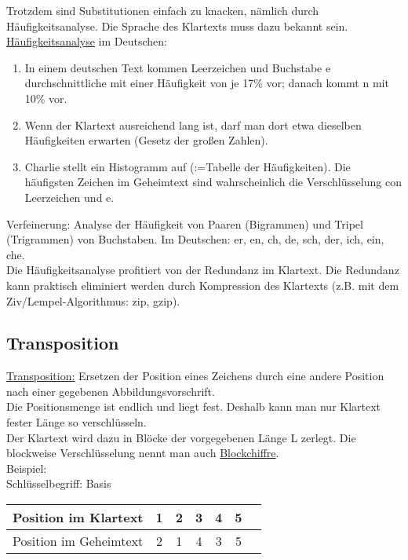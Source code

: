 \documentclass[a4paper,12pt]{article}
\begin{document}
Trotzdem sind Substitutionen einfach zu knacken, nämlich durch Häufigkeitsanalyse. Die Sprache des Klartexts muss dazu bekannt sein.\\
\underline{Häufigkeitsanalyse} im Deutschen:
\begin{enumerate}
 \item In einem deutschen Text kommen Leerzeichen und Buchstabe e durchschnittliche mit einer Häufigkeit von je 17\% vor; danach kommt n mit 10\% vor.
 \item Wenn der Klartext ausreichend lang ist, darf man dort etwa dieselben Häufigkeiten erwarten (\glqq Gesetz der großen Zahlen\grqq).
 \item Charlie stellt ein Histogramm auf (:=Tabelle der Häufigkeiten). Die häufigsten Zeichen im Geheimtext sind wahrscheinlich die Verschlüsselung con Leerzeichen und e.
\end{enumerate}
Verfeinerung: Analyse der Häufigkeit von Paaren (\glqq{}Bigrammen\grqq) und Tripel (\glqq Trigrammen\grqq) von Buchstaben. Im Deutschen: er, en, ch, de, sch, der, ich, ein, che.\\
Die Häufigkeitsanalyse profitiert von der Redundanz im Klartext. Die Redundanz kann praktisch eliminiert werden durch Kompression des Klartexts (z.B. mit dem Ziv/Lempel-Algorithmus: zip, gzip).

\subsection{Transposition}
\underline{Transposition:} Ersetzen der Position eines Zeichens durch eine andere Position nach einer gegebenen Abbildungsvorschrift.\\
Die Positionsmenge ist endlich und liegt fest. Deshalb kann man nur Klartext fester Länge so verschlüsseln.\\
Der Klartext wird dazu in Blöcke der vorgegebenen Länge L zerlegt. Die blockweise Verschlüsselung nennt man auch \underline{Blockchiffre}.\\
Beispiel:\\
Schlüsselbegriff: \glqq{}Basis\grqq
\begin{table}[h]
\centering
\begin{tabular}{l|c c c c c c}
Position im Klartext & 1 & 2 & 3 & 4 & 5 \\ \hline
Position im Geheimtext & 2 & 1 & 4 & 3 & 5\\
\end{tabular}
\end{table}
\end{document}

